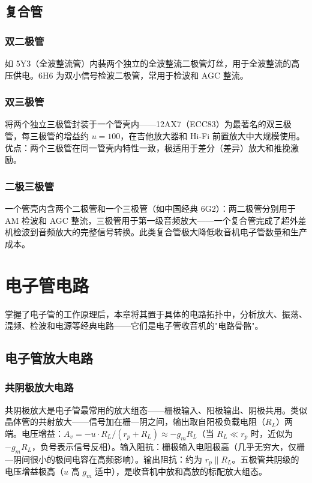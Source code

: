 \documentclass[12pt,UTF8]{ctexbook}
\begin{document}
\section{复合管}
\label{sec:tube_composite}

\subsection{双二极管}

如 5Y3（全波整流管）内装两个独立的全波整流二极管灯丝，用于全波整流的高压供电。6H6 为双小信号检波二极管，常用于检波和 AGC 整流。

\subsection{双三极管}

将两个独立三极管封装于一个管壳内——12AX7（ECC83）为最著名的双三极管，每三极管的增益约 $u=100$，在吉他放大器和 Hi-Fi 前置放大中大规模使用。优点：两个三极管在同一管壳内特性一致，极适用于差分（差异）放大和推挽激励。

\subsection{二极三极管}

一个管壳内含两个二极管和一个三极管（如中国经典 6G2）：两二极管分别用于 AM 检波和 AGC 整流，三极管用于第一级音频放大——一个复合管完成了超外差机检波到音频放大的完整信号转换。此类复合管极大降低收音机电子管数量和生产成本。


\chapter{电子管电路}
\label{chap:vacuum_tube_circuits}

掌握了电子管的工作原理后，本章将其置于具体的电路拓扑中，分析放大、振荡、混频、检波和电源等经典电路——它们是电子管收音机的"电路骨骼"。

\section{电子管放大电路}
\label{sec:tube_amplifier}

\subsection{共阴极放大电路}

共阴极放大是电子管最常用的放大组态——栅极输入、阳极输出、阴极共用。类似晶体管的共射放大——信号加在栅—阴之间，输出取自阳极负载电阻（$R_L$）两端。电压增益：$A_v = -u \cdot R_L/(r_p+R_L) \approx -g_m R_L$（当 $R_L \ll r_p$ 时，近似为 $-g_m R_L$，负号表示信号反相）。输入阻抗：栅极输入电阻极高（几乎无穷大，仅栅—阴间很小的极间电容在高频影响）。输出阻抗：约为 $r_p \parallel R_L$。五极管共阴级的电压增益极高（$u$ 高 $g_m$ 适中），是收音机中放和高放的标配放大组态。
\end{document}
